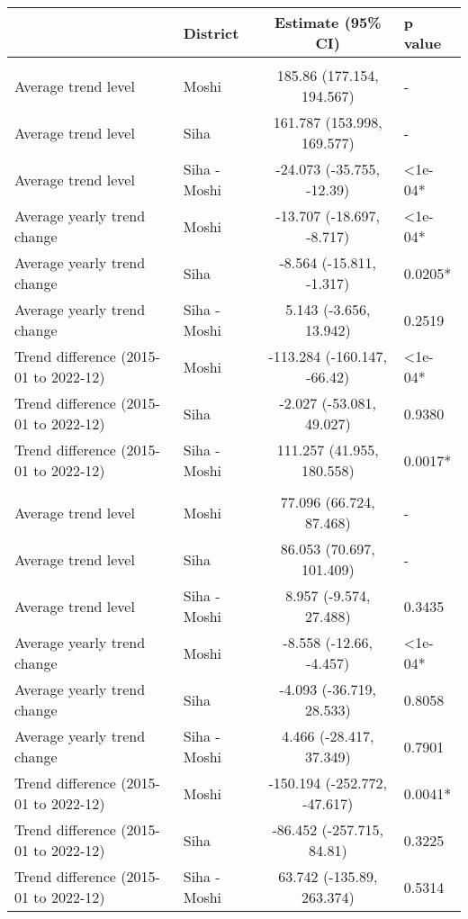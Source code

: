 \begingroup
\fontsize{12.0pt}{14.4pt}\selectfont
\begin{longtable}{l|lcl}
\toprule
 & District & Estimate (95\% CI) & p value \\ 
\midrule\addlinespace[2.5pt]
\multicolumn{4}{l}{Chronic Respiratory Disease} \\[2.5pt] 
\midrule\addlinespace[2.5pt]
Average trend level & Moshi & 185.86 (177.154, 194.567) & - \\ 
Average trend level & Siha & 161.787 (153.998, 169.577) & - \\ 
Average trend level & Siha - Moshi & -24.073 (-35.755, -12.39) & <1e-04* \\ 
Average yearly trend change & Moshi & -13.707 (-18.697, -8.717) & <1e-04* \\ 
Average yearly trend change & Siha & -8.564 (-15.811, -1.317) & 0.0205* \\ 
Average yearly trend change & Siha - Moshi & 5.143 (-3.656, 13.942) & 0.2519 \\ 
Trend difference (2015-01 to 2022-12) & Moshi & -113.284 (-160.147, -66.42) & <1e-04* \\ 
Trend difference (2015-01 to 2022-12) & Siha & -2.027 (-53.081, 49.027) & 0.9380 \\ 
Trend difference (2015-01 to 2022-12) & Siha - Moshi & 111.257 (41.955, 180.558) & 0.0017* \\ 
\midrule\addlinespace[2.5pt]
\multicolumn{4}{l}{Caries} \\[2.5pt] 
\midrule\addlinespace[2.5pt]
Average trend level & Moshi & 77.096 (66.724, 87.468) & - \\ 
Average trend level & Siha & 86.053 (70.697, 101.409) & - \\ 
Average trend level & Siha - Moshi & 8.957 (-9.574, 27.488) & 0.3435 \\ 
Average yearly trend change & Moshi & -8.558 (-12.66, -4.457) & <1e-04* \\ 
Average yearly trend change & Siha & -4.093 (-36.719, 28.533) & 0.8058 \\ 
Average yearly trend change & Siha - Moshi & 4.466 (-28.417, 37.349) & 0.7901 \\ 
Trend difference (2015-01 to 2022-12) & Moshi & -150.194 (-252.772, -47.617) & 0.0041* \\ 
Trend difference (2015-01 to 2022-12) & Siha & -86.452 (-257.715, 84.81) & 0.3225 \\ 
Trend difference (2015-01 to 2022-12) & Siha - Moshi & 63.742 (-135.89, 263.374) & 0.5314 \\ 

\end{longtable}
